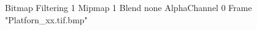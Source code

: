 {Bitmap
	{Filtering 1}
	{Mipmap 1}
	{Blend none}
	{AlphaChannel 0}
	{Frame "Platforn_xx.tif.bmp"}
}
